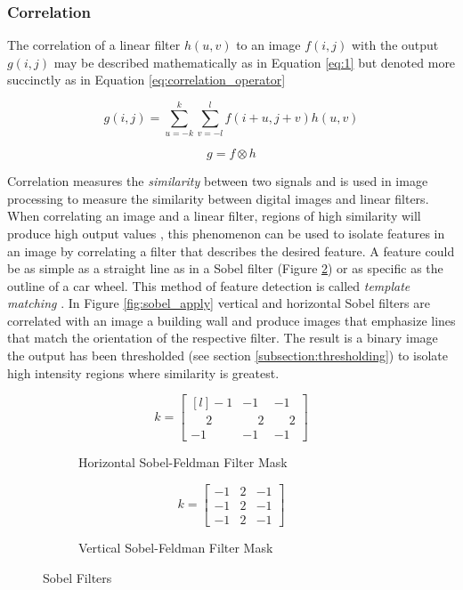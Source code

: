\subsubsection{Correlation}
\label{subsection:corr}

The correlation of a linear filter $h(u,v)$ to an image $f(i,j)$ with the output $g(i,j)$ may be described mathematically as in Equation \ref{eq:1} but denoted more succinctly as in Equation \ref{eq:correlation_operator}

\begin{equation} \label{eq:1}
g(i,j) = \sum_{u=-k}^{k}\sum_{v = -l}^{l}f(i+u,j+v)h(u,v)
\end{equation}

\begin{equation} \label{eq:correlation_operator}
g = f \otimes h
\end{equation}

Correlation measures the \emph{similarity} between two signals and is used in image processing to measure the similarity between digital images and linear filters. When correlating an image and a linear filter, regions of high similarity will produce high output values \cite{optimalKernel}, this phenomenon can be used to isolate features in an image by correlating a filter that describes the desired feature. A feature could be as simple as a straight line as in a Sobel filter (Figure \ref{fig:sobel_filters}) or as specific as the outline of a car wheel. This method of feature detection is called \emph{template matching} \cite{oreilly_python}. In Figure \ref{fig:sobel_apply} vertical and horizontal Sobel filters \cite{cv_matlab} are correlated with an image a building wall and produce images that emphasize lines that match the orientation of the respective filter. The result is a binary image the output has been thresholded (see section \ref{subsection:thresholding}) to isolate high intensity regions where similarity is greatest.

\begin{figure}[H]
  \begin{subfigure}[b]{0.49\textwidth}
    \[k =
    \begin{bmatrix*}[l]
     -1 & -1 & -1 \\
      \phantom{-}2 & \phantom{-}2 & \phantom{-}2 \\
      -1 & -1 & -1 
    \end{bmatrix*}
    \]
    \caption{Horizontal Sobel-Feldman Filter Mask}
    \label{rfidtest_xaxis}
\end{subfigure}
\begin{subfigure}[b]{0.49\textwidth}
  \[ k = 
    \begin{bmatrix}
      -1 & 2 & -1 \\
      -1 & 2 & -1 \\
      -1 & 2 & -1
    \end{bmatrix}
    \]
    \caption{Vertical Sobel-Feldman Filter Mask}  
\end{subfigure}
    \caption{Sobel Filters}
    \label{fig:sobel_filters}
\end{figure}

